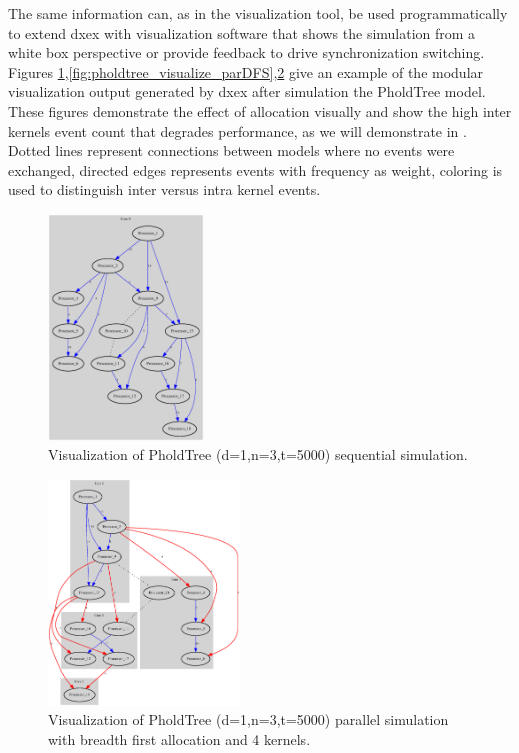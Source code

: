 The same information can, as in the visualization tool, be used programmatically to extend dxex with visualization software that shows the simulation from a white box perspective or provide feedback to drive synchronization switching.
Figures \ref{fig:pholdtree_visualize_seq},\ref{fig:pholdtree_visualize_parDFS},\ref{fig:pholdtree_visualize_parBFS} give an example of the modular visualization output generated by dxex after simulation the PholdTree model. These figures demonstrate the effect of allocation visually and show the high inter kernels event count that degrades performance, as we will demonstrate in
 . Dotted lines represent connections between models where no events were exchanged, directed edges represents events with frequency as weight, coloring is used to distinguish inter versus intra kernel events.
\begin{figure}
    \center
    \includegraphics[width=\plotfraction\columnwidth, height=6cm, keepaspectratio]{fig/pholdtreed1n3t5000.eps}
    \caption{Visualization of PholdTree (d=1,n=3,t=5000) sequential simulation.}
    \label{fig:pholdtree_visualize_seq}
\end{figure}
\begin{figure}
    \center
    \includegraphics[width=\plotfraction\columnwidth,  height=6cm, keepaspectratio]{fig/pholdtreed1n3t5000c4BFS.eps}
    \caption{Visualization of PholdTree (d=1,n=3,t=5000) parallel simulation with breadth first allocation and 4 kernels.}
    \label{fig:pholdtree_visualize_parBFS}
\end{figure}
